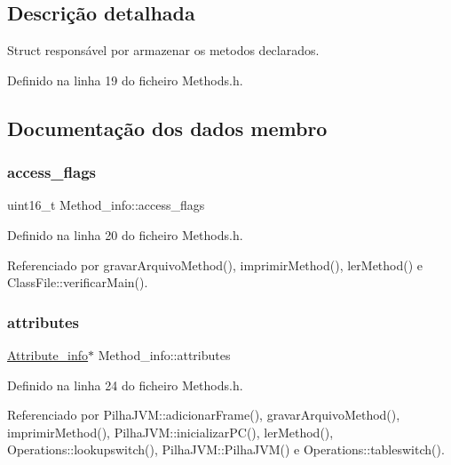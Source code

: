 \subsection{Descrição detalhada}
Struct responsável por armazenar os metodos declarados. 

Definido na linha 19 do ficheiro Methods.\+h.



\subsection{Documentação dos dados membro}
\mbox{\label{structMethod__info_a6d6c8c25f4bdb42b77b6a8ac6250398b}} 
\subsubsection{\texorpdfstring{access\+\_\+flags}{access\_flags}}
{\footnotesize\ttfamily uint16\+\_\+t Method\+\_\+info\+::access\+\_\+flags}



Definido na linha 20 do ficheiro Methods.\+h.



Referenciado por gravar\+Arquivo\+Method(), imprimir\+Method(), ler\+Method() e Class\+File\+::verificar\+Main().

\mbox{\label{structMethod__info_a56fbb565dcff2992d66f57b29774c322}} 
\subsubsection{\texorpdfstring{attributes}{attributes}}
{\footnotesize\ttfamily \hyperlink{structAttribute__info}{Attribute\+\_\+info}$\ast$ Method\+\_\+info\+::attributes}



Definido na linha 24 do ficheiro Methods.\+h.



Referenciado por Pilha\+J\+V\+M\+::adicionar\+Frame(), gravar\+Arquivo\+Method(), imprimir\+Method(), Pilha\+J\+V\+M\+::inicializar\+P\+C(), ler\+Method(), Operations\+::lookupswitch(), Pilha\+J\+V\+M\+::\+Pilha\+J\+V\+M() e Operations\+::tableswitch().

